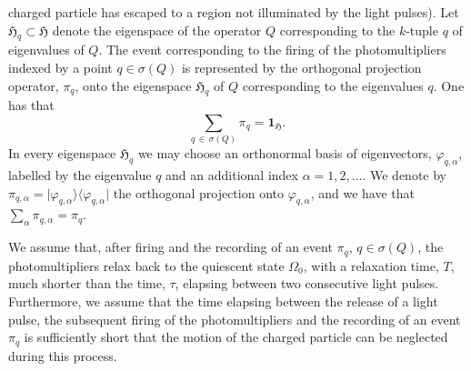 \documentclass[12pt]{article}
\begin{document}
 charged particle has escaped to a region not illuminated by the light pulses). 
Let $\mathfrak{H}_q \subset \mathfrak{H}$ denote the eigenspace of the operator $Q$ corresponding 
to the $k$-tuple $q$ of eigenvalues of $Q$. The event corresponding to the firing of the photomultipliers
indexed by a point $q\in \sigma(Q)$ is represented by the orthogonal projection operator, $\pi_{q}$, onto the eigenspace 
$\mathfrak{H}_q$ of $Q$ corresponding to the eigenvalues $q$. One has that
$$\sum_{q\,\in\, \sigma(Q)} \pi_{q} = \mathbf{1}_{\mathfrak{H}}.$$
In every eigenspace $\mathfrak{H}_{q}$ we may choose an orthonormal basis of eigenvectors, $\varphi_{q, \alpha}$, 
labelled by the eigenvalue $q$ and an additional index $\alpha=1,2, \dots$. We denote by 
$\pi_{q,\alpha}= \vert \varphi_{q, \alpha}\rangle \langle \varphi_{q, \alpha}\vert $ the orthogonal projection onto 
$\varphi_{q, \alpha}$, and we have that $\sum_{\alpha} \pi_{q, \alpha} = \pi_q$.

We assume that, after firing and the recording of an event $\pi_{q}$, $q\in \sigma(Q)$, the photomultipliers relax 
back to the quiescent state $\Omega_0$, with a relaxation time, $T$, much shorter than the time, $\tau$, elapsing between 
two consecutive light pulses. Furthermore, we assume that the time elapsing between the release of a light pulse, 
the subsequent firing of the photomultipliers and the recording of an event $\pi_q$ is sufficiently short 
that the motion of the charged particle can be neglected during this process. 
\end{document}
